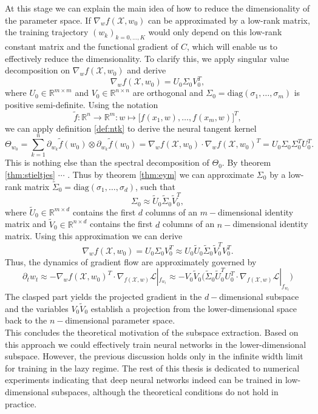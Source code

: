 \documentclass[11pt, a4paper]{article}
\newcommand{\R}{\mathds{R}}
\newcommand{\X}{\mathcal{X}}
\renewcommand{\L}{\mathcal{L}}
\begin{document}
At this stage we can explain the main idea of how to reduce the dimensionality of the parameter space. If $\nabla_wf(\X,w_0)$ can be approximated by a low-rank matrix, the training trajectory $(w_k)_{k=0, \dots, K}$ would only depend on this low-rank constant matrix and the functional gradient of $C$, which will enable us to effectively reduce the dimensionality. To clarify this, we apply singular value decomposition on $\nabla_wf(\X,w_0)$ and derive
\[ \nabla_wf(\X,w_0) = U_0 \Sigma_0 V_0^T, \]
where $U_0 \in \R^{m \times m}$ and $V_0 \in \R^{n \times n}$ are orthogonal and $\Sigma_0 = \text{diag}(\sigma_1, \dots, \sigma_m)$ is positive semi-definite. Using the notation
\[ \tilde{f}: \R^n \to \R^m : w \mapsto \Big [ f(x_1,w), \dots, f(x_m,w) \Big ]^T, \]
we can apply definition \ref{def:ntk} to derive the neural tangent kernel
\[ \Theta_{w_0} = \sum_{k=1}^{n} \partial_{w_k} \tilde{f}(w_0) \otimes \partial_{w_k} \tilde{f}(w_0) = \nabla_wf(\X,w_0) \cdot \nabla_wf(\X,w_0)^T = U_0 \Sigma_0 \Sigma_0^T U_0^T. \]
This is nothing else than the spectral decomposition of $\Theta_0$. By theorem \ref{thm:stieltjes} $\cdots$ . Thus by theorem \ref{thm:eym} we can approximate $\Sigma_0$ by a low-rank matrix $\tilde{\Sigma}_0 = \text{diag}(\sigma_1, \dots, \sigma_d)$, such that
\[ \Sigma_0 \approx \tilde{U}_0 \tilde{\Sigma}_0 \tilde{V}_0^T, \]
where $\tilde{U}_0 \in \R^{m \times d}$ contains the first $d$ columns of an $m-$dimensional identity matrix and $\tilde{V}_0 \in \R^{n \times d}$ contains the first $d$ columns of an $n-$dimensional identity matrix. Using this approximation we can derive
\[ \nabla_wf(\X,w_0) = U_0 \Sigma_0 V_0^T \approx U_0 \tilde{U}_0 \tilde{\Sigma}_0 \tilde{V}_0^T V_0^T. \]
Thus, the dynamics of gradient flow are approximately governed by
\[ \partial_t w_t \approx -\nabla_wf(\X,w_0)^T \cdot \nabla_{f(\X,w)} \L|_{f_{w_t}} \approx - V_0 \tilde{V}_0 \Big ( \tilde{\Sigma}_0 \tilde{U}_0^T U_0^T \cdot \nabla_{f(\X,w)} \L|_{f_{w_t}} \Big ) \]
The clasped part yields the projected gradient in the $d-$dimensional subspace and the variables $V_0 \tilde{V}_0$ establish a projection from the lower-dimensional space back to the $n-$dimensional parameter space. \\

This concludes the theoretical motivation of the subspace extraction. Based on this approach we could effectively train neural networks in the lower-dimensional subspace. However, the previous discussion holds only in the infinite width limit for training in the lazy regime. The rest of this thesis is dedicated to numerical experiments indicating that deep neural networks indeed can be trained in low-dimensional subspaces, although the theoretical conditions do not hold in practice. \\
\end{document}
